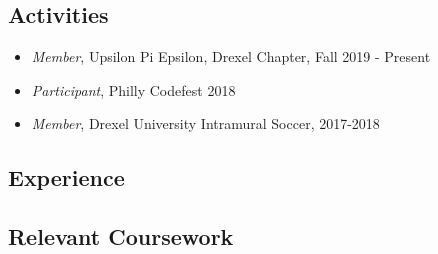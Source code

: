 \documentclass[10pt]{article}
\begin{document}
\begin{multicols}{2}
\subsection*{Activities}%
\label{sub:Activities}

\begin{itemize}
\setlength\itemsep{1em}
\item \emph{Member}, Upsilon Pi Epsilon, Drexel Chapter, Fall 2019 - Present
\item \emph{Participant}, Philly Codefest 2018
\item \emph{Member}, Drexel University Intramural Soccer, 2017-2018
\end{itemize}

\vfill\null
\columnbreak

\subsection*{Experience}%
\label{sub:Experience}



\end{multicols}

\subsection*{Relevant Coursework}%
\label{sub:Relevant Coursework}
\end{document}
